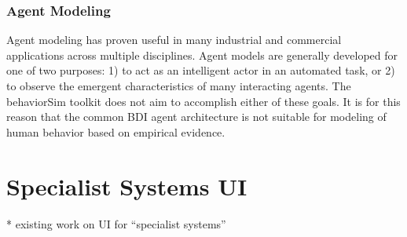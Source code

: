 \subsubsection{Agent Modeling}
Agent modeling has proven useful in many industrial and commercial applications across multiple disciplines. 
Agent models are generally developed for one of two purposes: 1) to act as an intelligent actor in an automated task, or 2) to observe the emergent characteristics of many interacting agents. 
The behaviorSim toolkit does not aim to accomplish either of these goals. 
It is for this reason that the common BDI agent architecture is not suitable for modeling of human behavior based on empirical evidence. 

\section{Specialist Systems UI}
* existing work on UI for “specialist systems”
